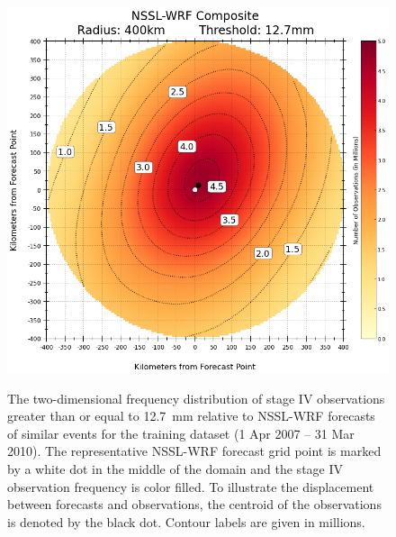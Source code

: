 \newpage
\begin{figure}[cc]
    \centering
    \includegraphics[width=35pc, angle=0]{./deterministic/figs/single_member_composite_400km_12-7mm.png}\\
    \caption{The two-dimensional frequency distribution of stage IV observations greater than or equal to \mbox{12.7 mm} relative to NSSL-WRF forecasts of similar events for the training dataset (1 Apr 2007 -- 31 Mar 2010).
    The representative NSSL-WRF forecast grid point is marked by a white dot in the middle of the domain and the stage IV observation frequency is color filled.
    To illustrate the displacement between forecasts and observations, the centroid of the observations is denoted by the black dot.
    Contour labels are given in millions.}
    \label{single_12thresh}
\end{figure}


